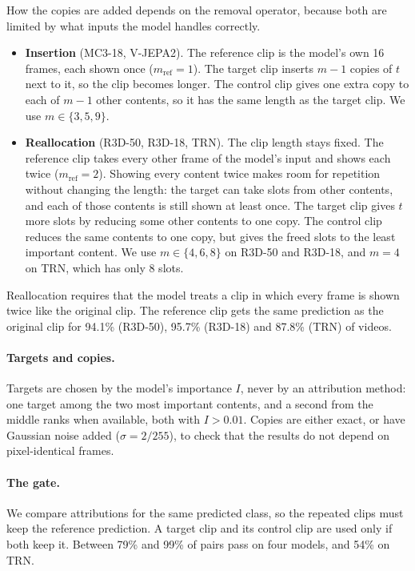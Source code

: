 How the copies are added depends on the removal operator, because both are limited by what inputs the model handles correctly.
\begin{itemize}
  \item \textbf{Insertion} (MC3-18, V-JEPA2). The reference clip is the model's own 16 frames, each shown once ($m_{\mathrm{ref}} = 1$). The target clip inserts $m - 1$ copies of $t$ next to it, so the clip becomes longer. The control clip gives one extra copy to each of $m - 1$ other contents, so it has the same length as the target clip. We use $m \in \{3, 5, 9\}$.
  \item \textbf{Reallocation} (R3D-50, R3D-18, TRN). The clip length stays fixed. The reference clip takes every other frame of the model's input and shows each twice ($m_{\mathrm{ref}} = 2$). Showing every content twice makes room for repetition without changing the length: the target can take slots from other contents, and each of those contents is still shown at least once. The target clip gives $t$ more slots by reducing some other contents to one copy. The control clip reduces the same contents to one copy, but gives the freed slots to the least important content. We use $m \in \{4, 6, 8\}$ on R3D-50 and R3D-18, and $m = 4$ on TRN, which has only 8 slots.
\end{itemize}
Reallocation requires that the model treats a clip in which every frame is shown twice like the original clip.
The reference clip gets the same prediction as the original clip for 94.1\% (R3D-50), 95.7\% (R3D-18) and 87.8\% (TRN) of videos.

\paragraph{Targets and copies.}
Targets are chosen by the model's importance $I$, never by an attribution method: one target among the two most important contents, and a second from the middle ranks when available, both with $I > 0.01$.
Copies are either exact, or have Gaussian noise added ($\sigma = 2/255$), to check that the results do not depend on pixel-identical frames.

\paragraph{The gate.}
We compare attributions for the same predicted class, so the repeated clips must keep the reference prediction.
A target clip and its control clip are used only if both keep it.
Between 79\% and 99\% of pairs pass on four models, and 54\% on TRN.


